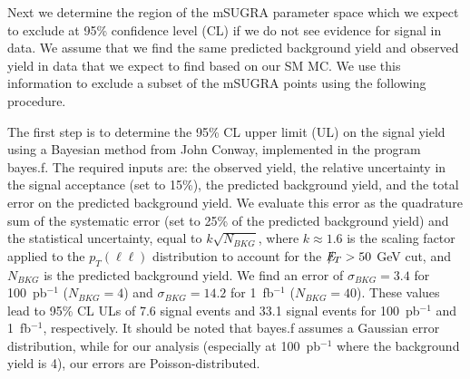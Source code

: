 Next we  determine the region of  the mSUGRA parameter  space which we
expect  to exclude  at 95\%  confidence level  (CL) if  we do  not see
evidence  for  signal  in data.   We  assume  that  we find  the  same
predicted background yield  and observed yield in data  that we expect
to  find based on  our SM  MC. We  use this  information to  exclude a
subset of the mSUGRA points using the following procedure.

The first  step is to  determine the 95\%  CL upper limit (UL)  on the
signal yield using a Bayesian  method from John Conway, implemented in
the program bayes.f. The required  inputs are: the observed yield, the
relative  uncertainty in  the  signal acceptance  (set  to 15\%),  the
predicted  background yield,  and  the total  error  on the  predicted
background yield. We evaluate this  error as the quadrature sum of the
systematic error (set  to 25\% of the predicted  background yield) and
the  statistical   uncertainty,  equal  to   $k\sqrt{N_{BKG}}$,  where
$k\approx1.6$ is  the scaling factor applied  to the $p_{T}(\ell\ell)$
distribution to  account for the  $E\!\!\!\!/_T>50~$GeV cut, and  $N_{BKG}$ is
the   predicted    background   yield.    We   find    an   error   of
$\sigma_{BKG}=3.4$     for     100~pb$^{-1}$     ($N_{BKG}=4$)     and
$\sigma_{BKG}=14.2$ for 1~fb$^{-1}$  ($N_{BKG}=40$). These values lead
to  95\% CL  ULs  of 7.6  signal  events and  33.1  signal events  for
100~pb$^{-1}$ and  1~fb$^{-1}$, respectively. It should  be noted that
bayes.f assumes a Gaussian  error distribution, while for our analysis
(especially  at 100~pb$^{-1}$ where  the background  yield is  4), our
errors are Poisson-distributed.

